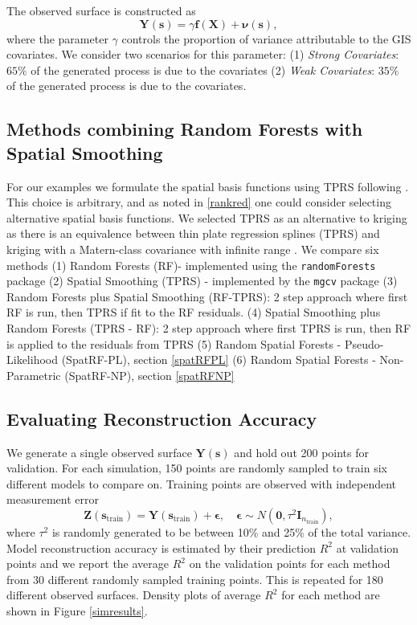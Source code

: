 \documentclass[12pt]{article}
\newcommand{\proc}{\mathbf{Y}(\mathbf{s})}
\newcommand{\covs}{\mathbf{X}}
\newcommand{\nggt}{\boldsymbol{\epsilon}}
\newcommand{\forest}{\mathbf{f}({\covs})}
\newcommand{\spproc}{\boldsymbol{\nu}(\mathbf{s})}
\begin{document}
The observed surface is constructed as 
$$\proc = \gamma \forest + \spproc,$$
where the parameter $\gamma$ controls the proportion of variance attributable to the GIS covariates. We consider two scenarios for this parameter: (1) \textit{Strong Covariates}: $65\%$ of the generated process is due to the covariates (2) \textit{Weak Covariates}: $35\%$ of the generated process is due to the covariates.

\subsection{Methods combining Random Forests with Spatial Smoothing}
For our examples we formulate the spatial basis functions using TPRS following \cite{olives2014reduced}. This choice is arbitrary, and as noted in \ref{rankred} one could consider selecting alternative spatial basis functions. We selected TPRS as an alternative to kriging as there is an equivalence between thin plate regression splines (TPRS) and kriging with a Matern-class covariance with infinite range \citep{nychka2000spatial}. We compare six methods (1) Random Forests (RF)- implemented using the \texttt{randomForests} package (2) Spatial Smoothing (TPRS) - implemented by the \texttt{mgcv} package (3) Random Forests plus Spatial Smoothing (RF-TPRS): 2 step approach where first RF is run, then TPRS if fit to the RF residuals. (4) Spatial Smoothing plus Random Forests (TPRS - RF): 2 step approach where first TPRS is run, then RF is applied to the residuals from TPRS (5) Random Spatial Forests - Pseudo-Likelihood (SpatRF-PL), section \ref{spatRFPL} (6) Random Spatial Forests - Non-Parametric (SpatRF-NP), section \ref{spatRFNP}

\subsection{Evaluating Reconstruction Accuracy } 
We generate a single observed surface $\proc$ and hold out 200 points for validation. For each simulation, 150 points are randomly sampled to train six different models to compare on. Training points are observed with independent measurement error 
$$ \mathbf{Z}(\mathbf{s}_\text{train}) = \mathbf{Y}(\mathbf{s}_\text{train}) + \nggt, \quad \nggt \sim N \left( \mathbf{0},\tau^2 \mathbf{I}_{n_\text{train}} \right),$$ 
where $\tau^2$ is randomly generated to be between 10\% and 25\% of the total variance. 
Model reconstruction accuracy is estimated by their prediction $R^2$ at validation points and we report the average $R^2$ on the validation points for each method from 30 different randomly sampled training points. This is repeated for 180 different observed surfaces.  Density plots of average $R^2$ for each method are shown in Figure \ref{simresults}. 
\end{document}
